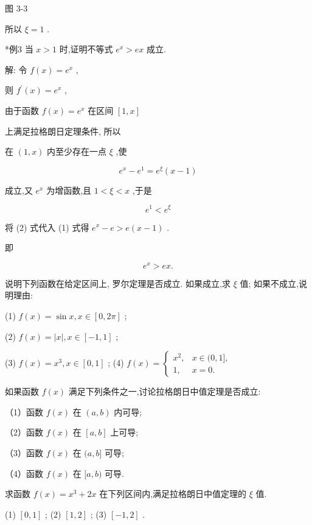\documentclass[lang=cn,newtx,12pt,scheme=chinese]{elegantbook}
\begin{document}
图 3-3

所以 \(\xi = 1\) .

*例3 当 \(x > 1\) 时,证明不等式 \({e}^{x} > {ex}\) 成立.

解: 令 \(f\left( x\right) = {e}^{x}\) ,

则 \({f}^{\prime }\left( x\right) = {e}^{x}\) ,

由于函数 \(f\left( x\right) = {e}^{x}\) 在区间 \(\left\lbrack {1,x}\right\rbrack\)

上满足拉格朗日定理条件, 所以

在 \(\left( {1,x}\right)\) 内至少存在一点 \(\xi\) ,使

\[
{e}^{x} - {e}^{1} = {e}^{\xi }\left( {x - 1}\right) \tag{1}
\]

成立,又 \({e}^{x}\) 为增函数,且 \(1 < \xi < x\) ,于是

\[
{e}^{1} < {e}^{\xi } \tag{2}
\]

将 (2) 式代入 (1) 式得 \({e}^{x} - e > e\left( {x - 1}\right)\) .

即

\[
{e}^{x} > {ex}\text{.}
\]

\begin{problemset}[练习]

\item 说明下列函数在给定区间上, 罗尔定理是否成立. 如果成立,求 \(\xi\) 值; 如果不成立,说明理由:

(1) \(f\left( x\right) = \sin x,x \in \left\lbrack {0,{2\pi }}\right\rbrack\) ;

(2) \(f\left( x\right) = \left| x\right| ,x \in \left\lbrack {-1,1}\right\rbrack\) ;

(3) \(f\left( x\right) = {x}^{3},x \in \left\lbrack {0,1}\right\rbrack\) ; (4) \(f\left( x\right) = \left\{ \begin{array}{ll} {x}^{2}, & x \in (0,1\rbrack , \\ 1, & x = 0. \end{array}\right.\)

\item 如果函数 \(f\left( x\right)\) 满足下列条件之一,讨论拉格朗日中值定理是否成立:

（1）函数 \(f\left( x\right)\) 在 \(\left( {a,b}\right)\) 内可导;

（2）函数 \(f\left( x\right)\) 在 \(\left\lbrack {a,b}\right\rbrack\) 上可导;

（3）函数 \(f\left( x\right)\) 在 \((a,b\rbrack\) 可导;

（4）函数 \(f\left( x\right)\) 在 \(\lbrack a,b)\) 可导.

\item 求函数 \(f\left( x\right) = {x}^{3} + {2x}\) 在下列区间内,满足拉格朗日中值定理的 \(\xi\) 值.

(1) \(\left\lbrack {0,1}\right\rbrack\) ; (2) \(\left\lbrack {1,2}\right\rbrack\) ; (3) \(\left\lbrack {-1,2}\right\rbrack\) .

\end{problemset}
\end{document}
